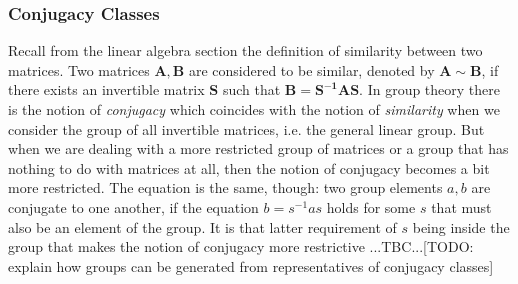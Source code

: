 \subsubsection{Conjugacy Classes}
Recall from the linear algebra section the definition of similarity between two matrices. Two matrices $\mathbf{A,B}$ are considered to be similar, denoted by $\mathbf{A} \sim \mathbf{B}$, if there exists an invertible matrix $\mathbf{S}$ such that $\mathbf{B} = \mathbf{S^{-1} A S}$. In group theory there is the notion of \emph{conjugacy} which coincides with the notion of \emph{similarity} when we consider the group of all invertible matrices, i.e. the general linear group. But when we are dealing with a more restricted group of matrices or a group that has nothing to do with matrices at all, then the notion of conjugacy becomes a bit more restricted. The equation is the same, though: two group elements $a,b$ are conjugate to one another, if the equation $b = s^{-1} a s$ holds for some $s$ that must also be an element of the group. It is that latter requirement of $s$ being inside the group that makes the notion of conjugacy more restrictive ...TBC...[TODO: explain how groups can be generated from representatives of conjugacy classes]







